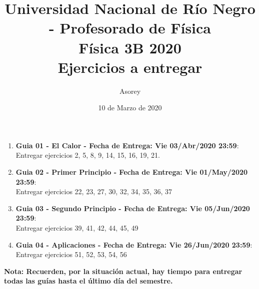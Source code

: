 \documentclass[a4paper,12pt]{article}
\begin{document}
\title{
{\normalsize{Universidad Nacional de Río Negro - Profesorado de Física}}\\
Física 3B 2020\\ Ejercicios a entregar}
\author{Asorey}
\date{10 de Marzo de 2020}
\maketitle

\begin{enumerate}
	\item {\bf{Guia 01 - El Calor - Fecha de Entrega: Vie 03/Abr/2020 23:59}}:\\
		Entregar ejercicios 2, 5, 8, 9, 14, 15, 16, 19, 21.
	\item {\bf{Guia 02 - Primer Principio - Fecha de Entrega: Vie 01/May/2020 23:59}}:\\		
		Entregar ejercicios 22, 23, 27, 30, 32, 34, 35, 36, 37
	\item {\bf{Guia 03 - Segundo Principio - Fecha de Entrega: Vie 05/Jun/2020 23:59}}:\\		
		Entregar ejercicios 39, 41, 42, 44, 45, 49
	\item {\bf{Guia 04 - Aplicaciones - Fecha de Entrega: Vie 26/Jun/2020 23:59}}:\\		
		Entregar ejercicios 51, 52, 53, 54, 56
\end{enumerate}

{\bf{Nota: Recuerden, por la situación actual, hay tiempo para entregar todas las guías hasta el último día del semestre.}}
\end{document}
